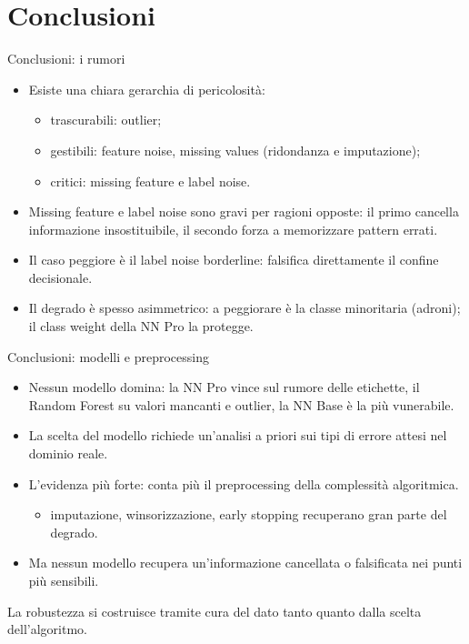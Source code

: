 \documentclass[aspectratio=169,11pt]{beamer}
\begin{document}
\section{Conclusioni}
\begin{frame}{Conclusioni: i rumori}
  \begin{itemize}
    \item Esiste una chiara gerarchia di pericolosità:
          \begin{itemize}
            \item[$\circ$] trascurabili: outlier;
            \item[$\circ$] gestibili: feature noise, missing values
                  (ridondanza e imputazione);
            \item[$\circ$] critici: missing feature e label noise.
          \end{itemize}
    \item Missing feature e label noise sono gravi per ragioni opposte:
          il primo cancella informazione insostituibile, il secondo forza a
          memorizzare pattern errati.
    \item Il caso peggiore è il label noise borderline: falsifica
          direttamente il confine decisionale.
    \item Il degrado è spesso asimmetrico: a peggiorare è la classe
          minoritaria (adroni); il class weight della NN Pro la protegge.
  \end{itemize}
\end{frame}

\begin{frame}{Conclusioni: modelli e preprocessing}
  \begin{itemize}
    \item Nessun modello domina: la NN Pro vince sul rumore delle
          etichette, il Random Forest su valori mancanti e outlier, la NN Base è
          la più vunerabile.
    \item La scelta del modello richiede un'analisi a priori sui tipi di
          errore attesi nel dominio reale.
    \item L'evidenza più forte: conta più il preprocessing della
          complessità algoritmica.
          \begin{itemize}
            \item[$\circ$] imputazione, winsorizzazione, early stopping recuperano
                  gran parte del degrado.
          \end{itemize}
    \item Ma nessun modello recupera un'informazione cancellata o
          falsificata nei punti più sensibili.
  \end{itemize}
  \vfill
  La robustezza si costruisce tramite cura del dato tanto quanto dalla scelta dell'algoritmo.
\end{frame}
\end{document}
